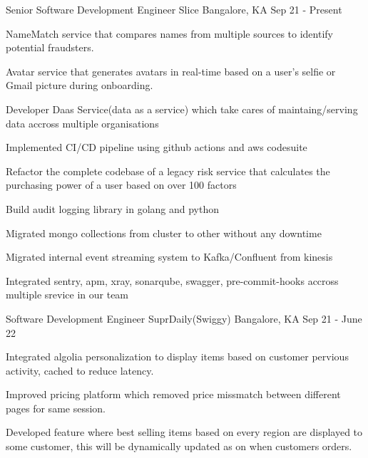 \begin{cventries}
  \cventry
    {Senior Software Development Engineer}
    {Slice}
    {Bangalore, KA}
    {Sep 21 - Present}
    {
      \begin{cvitems}
        \item {NameMatch service that compares names from multiple sources to identify potential fraudsters.}
        \item {Avatar service that generates avatars in real-time based on a user's selfie or Gmail picture during onboarding.}
        \item {Developer Daas Service(data as a service) which take cares of maintaing/serving data accross multiple organisations}
        \item {Implemented CI/CD pipeline using github actions and aws codesuite}
        \item {Refactor the complete codebase of a legacy risk service that calculates the purchasing power of a user based on over 100 factors}
        \item {Build audit logging library in golang and python}
        \item {Migrated mongo collections from cluster to other without any downtime}
        \item {Migrated internal event streaming system to Kafka/Confluent from kinesis}
        \item {Integrated sentry, apm, xray, sonarqube, swagger, pre-commit-hooks accross multiple srevice in our team}
      \end{cvitems}
    }
  
  \cventry
    {Software Development Engineer}
    {SuprDaily(Swiggy)}
    {Bangalore, KA}
    {Sep 21 - June 22}
    {
      \begin{cvitems}
        \item {Integrated algolia personalization to display items based on customer pervious activity, cached to reduce latency.}
        \item {Improved pricing platform which removed price missmatch between different pages for same session.}
        \item {Developed feature where best selling items based on every region are displayed to some customer, this will be dynamically updated as on when customers orders.}
      \end{cvitems}
    }
  

\end{cventries}
